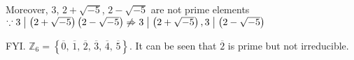 
Moreover, $3$, $2+\sqrt{-5}$, $2-\sqrt{-5}$ are not prime elements
$\because 3\bigm| \left(2+\sqrt{-5}\right)\left(2-\sqrt{-5}\right) \not\Rightarrow 3\bigm|\left(2+\sqrt{-5}\right),
3\bigm|\left(2-\sqrt{-5}\right)$

FYI. $\mathbb{Z}_6=\left\{ \overline{0},\,\overline{1},\,\overline{2},\,\overline{3},\,\overline{4},\,\overline{5}\right\}$.
It can be seen that $\overline{2}$ is prime but not irreducible.